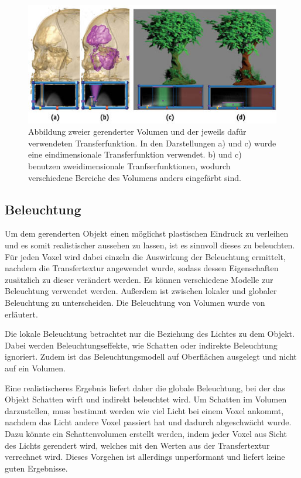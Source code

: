 \begin{figure}[!htb]
	\centering
	\includegraphics[width=0.7\linewidth]{images/transferfunction.jpg}
	\caption{Abbildung zweier gerenderter Volumen und der jeweils dafür verwendeten Transferfunktion. In den Darstellungen a) und c) wurde eine eindimensionale Transferfunktion verwendet. b) und c) benutzen zweidimensionale Tranfserfunktionen, wodurch verschiedene Bereiche des Volumens anders eingefärbt sind.}
	\label{img:transferfunction}
\end{figure}
\FloatBarrier


\subsection{Beleuchtung}
\label{beleuchtung}

Um dem gerenderten Objekt einen möglichst plastischen Eindruck zu verleihen und es somit realistischer aussehen zu lassen, ist es sinnvoll dieses zu beleuchten. 
Für jeden Voxel wird dabei einzeln die Auswirkung der Beleuchtung ermittelt, nachdem die  Transfertextur angewendet wurde, sodass dessen Eigenschaften zusätzlich zu dieser verändert werden. Es können verschiedene Modelle zur Beleuchtung verwendet werden. Außerdem ist zwischen lokaler und globaler Beleuchtung zu unterscheiden. Die Beleuchtung von Volumen wurde von \cite{Fernando04} erläutert.

Die lokale Beleuchtung betrachtet nur die Beziehung des Lichtes zu dem Objekt. Dabei werden Beleuchtungseffekte, wie Schatten oder indirekte Beleuchtung ignoriert. Zudem ist das Beleuchtungsmodell auf Oberflächen ausgelegt und nicht auf ein Volumen. 

Eine realistischeres Ergebnis liefert daher die globale Beleuchtung, bei der das Objekt Schatten wirft und indirekt beleuchtet wird. 
Um Schatten im Volumen darzustellen, muss bestimmt werden wie viel Licht bei einem Voxel ankommt, nachdem das Licht andere Voxel passiert hat und dadurch abgeschwächt wurde. 
Dazu könnte ein Schattenvolumen erstellt werden, indem jeder Voxel aus Sicht des Lichts gerendert wird, welches mit den Werten aus der Transfertextur verrechnet wird. Dieses Vorgehen ist allerdings unperformant und liefert keine guten Ergebnisse.

